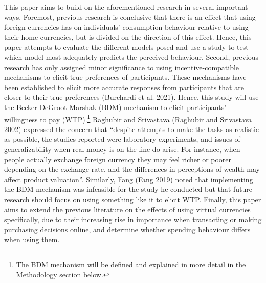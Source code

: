 \documentclass[
]{report}
\begin{document}
This paper aims to build on the aforementioned research in several
important ways. Foremost, previous research is conclusive that there is
an effect that using foreign currencies has on individuals' consumption
behaviour relative to using their home currencies, but is divided on the
direction of this effect. Hence, this paper attempts to evaluate the
different models posed and use a study to test which model most
adequately predicts the perceived behaviour. Second, previous research
has only assigned minor significance to using incentive-compatible
mechanisms to elicit true preferences of participants. These mechanisms
have been established to elicit more accurate responses from
participants that are closer to their true preferences (Burchardi et al.
2021). Hence, this study will use the Becker-DeGroot-Marshak (BDM)
mechanism to elicit participants' willingness to pay (WTP).\footnote{
  The BDM mechanism will be defined and explained in more detail in the
  Methodology section below.} Raghubir and Srivastava (Raghubir and
Srivastava 2002) expressed the concern that ``despite attempts to make
the tasks as realistic as possible, the studies reported were laboratory
experiments, and issues of generalizability when real money is on the
line do arise. For instance, when people actually exchange foreign
currency they may feel richer or poorer depending on the exchange rate,
and the differences in perceptions of wealth may affect product
valuation''. Similarly, Fang (Fang 2019) noted that implementing the BDM
mechanism was infeasible for the study he conducted but that future
research should focus on using something like it to elicit WTP. Finally,
this paper aims to extend the previous literature on the effects of
using virtual currencies specifically, due to their increasing rise in
importance when transacting or making purchasing decisions online, and
determine whether spending behaviour differs when using them.
\end{document}
